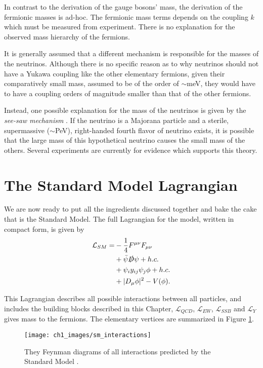 \documentclass[10pt,a4paper]{book}
\begin{document}
In contrast to the derivation of the gauge bosons' mass, the derivation of the fermionic masses is ad-hoc. The fermionic mass terms depends on the coupling $k$ which must be measured from experiment. There is no explanation for the observed mass hierarchy of the fermions.

It is generally assumed that a different mechanism is responsible for the masses of the neutrinos. Although there is no specific reason as to why neutrinos should not have a Yukawa coupling like the other elementary fermions, given their comparatively small mass, assumed to be of the order of $\sim$meV, they would have to have a coupling orders of magnitude smaller than that of the other fermions. 

Instead, one possible explanation for the mass of the neutrinos is given by the \emph{see-saw mechanism} \cite{zuber}. If the neutrino is a Majorana particle and a sterile, supermassive ($\sim$PeV), right-handed fourth flavor of neutrino exists, it is possible that the large mass of this hypothetical neutrino causes the small mass of the others. Several experiments are currently for evidence which supports this theory.
\section{The Standard Model Lagrangian}

We are now ready to put all the ingredients discussed together and bake the cake that is the Standard Model. The full Lagrangian for the model, written in compact form, is given by
\begin{equation}
\begin{aligned}
\mathcal{L}_{SM} = &-\frac{1}{4}F^{\mu\nu}F_{\mu\nu}\\ 
&+ \bar{\psi}\slashed{D}\psi + h.c.\\
&+ \psi_iy_{ij}\psi_j\phi + h.c. \\
&+ \vert D_\mu\phi \vert^2 - V(\phi).
\end{aligned}
\end{equation}

This Lagrangian describes all possible interactions between all particles, and includes the building blocks described in this Chapter, $\mathcal{L}_{QCD}$, $\mathcal{L}_{EW}$, $\mathcal{L}_{SSB}$ and $\mathcal{L}_Y$ gives mass to the fermions. The elementary vertices are summarized in Figure \ref{Standard Model interactions}. 

\begin{figure}
\centering
\texttt{[image: ch1\_images/sm\_interactions]}
\caption{They Feynman diagrams of all interactions predicted by the Standard Model \cite{sm_interactions}.}
\label{Standard Model interactions}
\end{figure}
\end{document}
